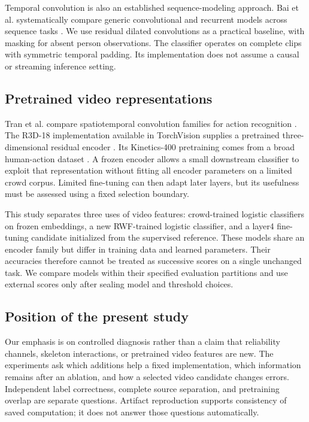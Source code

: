 Temporal convolution is also an established sequence-modeling approach. Bai et al. systematically compare generic convolutional and recurrent models across sequence tasks \cite{bai2018}. We use residual dilated convolutions as a practical baseline, with masking for absent person observations. The classifier operates on complete clips with symmetric temporal padding. Its implementation does not assume a causal or streaming inference setting.

\subsection{Pretrained video representations}
Tran et al. compare spatiotemporal convolution families for action recognition \cite{tran2018}. The R3D-18 implementation available in TorchVision supplies a pretrained three-dimensional residual encoder \cite{torchvision}. Its Kinetics-400 pretraining comes from a broad human-action dataset \cite{kay2017}. A frozen encoder allows a small downstream classifier to exploit that representation without fitting all encoder parameters on a limited crowd corpus. Limited fine-tuning can then adapt later layers, but its usefulness must be assessed using a fixed selection boundary.

This study separates three uses of video features: crowd-trained logistic classifiers on frozen embeddings, a new RWF-trained logistic classifier, and a layer4 fine-tuning candidate initialized from the supervised reference. These models share an encoder family but differ in training data and learned parameters. Their accuracies therefore cannot be treated as successive scores on a single unchanged task. We compare models within their specified evaluation partitions and use external scores only after sealing model and threshold choices.

\subsection{Position of the present study}
Our emphasis is on controlled diagnosis rather than a claim that reliability channels, skeleton interactions, or pretrained video features are new. The experiments ask which additions help a fixed implementation, which information remains after an ablation, and how a selected video candidate changes errors. Independent label correctness, complete source separation, and pretraining overlap are separate questions. Artifact reproduction supports consistency of saved computation; it does not answer those questions automatically.

